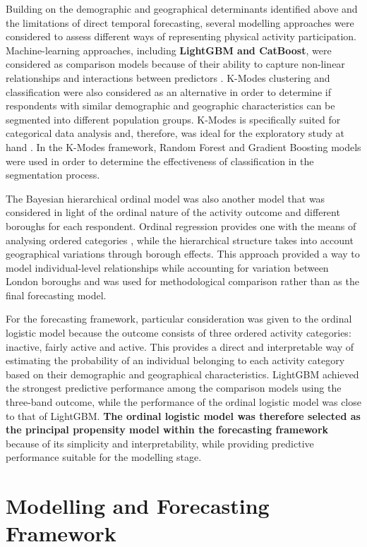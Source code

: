 \documentclass[ %
                    author={Ashrey Ashrey, Sanya Kapoor, Trisha Sharma, Yash Bhooshan Pandloskar},
                supervisor={Dr. Dalila O’Grady},
                    degree={MSc},
                     title={Using machine learning to forecast physical activity participation, volunteering and activity patterns in London},
                  subtitle={},
                      type={},
                      year={2021}]{dissertation}
\begin{document}
Building on the demographic and geographical determinants identified above and the limitations of direct temporal forecasting, several modelling approaches were considered to assess different ways of representing physical activity participation. Machine-learning approaches, including \textbf{LightGBM and CatBoost}, were considered as comparison models because of their ability to capture non-linear relationships and interactions between predictors \cite{ke_etal_2017,prokhorenkova_etal_2018}. K-Modes clustering and classification were also considered as an alternative in order to determine if respondents with similar demographic and geographic characteristics can be segmented into different population groups. K-Modes is specifically suited for categorical data analysis and, therefore, was ideal for the exploratory study at hand \cite{huang_1997}. In the K-Modes framework, Random Forest and Gradient Boosting models were used in order to determine the effectiveness of classification in the segmentation process.

The Bayesian hierarchical ordinal model was also another model that was considered in light of the ordinal nature of the activity outcome and different boroughs for each respondent. Ordinal regression provides one with the means of analysing ordered categories \cite{mccullagh_1980}, while the hierarchical structure takes into account geographical variations through borough effects. This approach provided a way to model individual-level relationships while accounting for variation between London boroughs and was used for methodological comparison rather than as the final forecasting model.

For the forecasting framework, particular consideration was given to the ordinal logistic model because the outcome consists of three ordered activity categories: inactive, fairly active and active. This provides a direct and interpretable way of estimating the probability of an individual belonging to each activity category based on their demographic and geographical characteristics. LightGBM achieved the strongest predictive performance among the comparison models using the three-band outcome, while the performance of the ordinal logistic model was close to that of LightGBM. \textbf{The ordinal logistic model was therefore selected as the principal propensity model within the forecasting framework} because of its simplicity and interpretability, while providing predictive performance suitable for the modelling stage.

\section{Modelling and Forecasting Framework}
\end{document}

